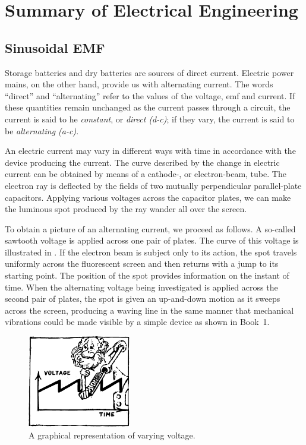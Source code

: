 

\cleardoublepage
\chapter{Summary of Electrical Engineering}
\label{ch-04}

\section{Sinusoidal EMF}

Storage batteries and dry batteries are sources of direct current. Electric power mains, on the other hand, provide us with alternating current. The words ``direct'' and ``alternating'' refer to the values of the voltage, emf and current. If these quantities remain unchanged as the current passes through a circuit, the current is said to he \emph{constant}, or \emph{direct (d-c)}; if they vary, the current is said to be \emph{alternating (a-c)}.

An electric current may vary in different ways with time in accordance with the device producing the current. The curve described by the change in electric current can be obtained by means of a cathode-, or electron-beam, tube. The electron ray is deflected by the fields of two mutually perpendicular parallel-plate capacitors. Applying various voltages across the capacitor plates, we can make the luminous spot produced by the ray wander all over the screen.

To obtain a picture of an alternating current, we proceed as follows. A so-called sawtooth voltage is applied across one pair of plates. The curve of this voltage is illustrated in . If the electron beam is subject only to its action, the spot travels uniformly across the fluorescent screen and then returns with a jump to its starting point. The position of the spot provides information on the instant of time. When the alternating voltage being investigated is applied across the second pair of plates, the spot is given an up-and-down motion as it sweeps across the screen, producing a waving line in the same manner that mechanical vibrations could be made visible by a simple device as shown in Book~1. 
\begin{figure}[!ht]
\centering
\includegraphics[width=0.4\textwidth]{figures/fig-04-01.pdf}
\caption{A graphical representation of varying voltage.}
\label{fig-4.1}
\end{figure}

